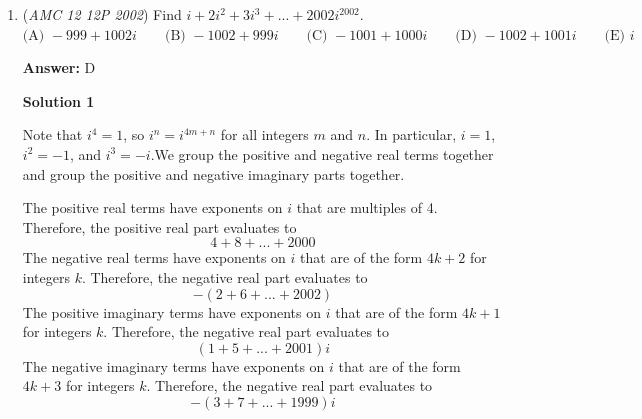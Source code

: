 \begin{enumerate}
 Essentially, this boils down to writing $217$ as a difference of squares. Assume there exist positive integers $a$ and $b$ where $a > 17$ and $b \leq 17$ such that $a^2 - b^2 = 217$.

 We can rewrite this as $(a+b)(a-b) = 217$. Since $217 = 7 \cdot 31$, either $a+b = 217$ and $a-b = 1$ or $a+b = 31$ and $a-b = 7$. We analyze each case separately.

 Case 1: $a+b = 217$ and $a-b = 1$

 Solving this system of equations gives $a = 109$ and $b = 108$. However, $108 > 17$, so this case does not yield a solution.

 Case 2: $a+b = 31$ and $a-b = 7$

 Solving this system of equations gives $a = 19$ and $b = 12$. This satisfies all the requirements of the problem.

 The list $1, 2 ... 11, 13, 14 ... 17, 19$ has $17$ terms whose sum of squares equals $2002$. Since $n \geq 18$ is impossible, the answer is $\boxed {\textbf{(D) }17}$.

 


	\item (\textit{AMC 12 12P 2002}) Find $i + 2i^2 +3i^3 + . . . + 2002i^{2002}.$
$\text{(A) }-999 + 1002i \qquad \text{(B) }-1002 + 999i \qquad \text{(C) }-1001 + 1000i \qquad \text{(D) }-1002 + 1001i \qquad \text{(E) }i$

 \textbf{Answer: }D



\textbf{Solution 1}

Note that $i^4 = 1$, so $i^n = i^{4m+n}$ for all integers $m$ and $n$. In particular, $i = 1$, $i^2 = -1$, and $i^3 = -i$.We group the positive and negative real terms together and group the positive and negative imaginary parts together.

 The positive real terms have exponents on $i$ that are multiples of 4. Therefore, the positive real part evaluates to 
 \[4 + 8 + ... + 2000\]The negative real terms have exponents on $i$ that are of the form $4k + 2$ for integers $k$. Therefore, the negative real part evaluates to 
 \[-(2 + 6 + ... + 2002)\]The positive imaginary terms have exponents on $i$ that are of the form $4k + 1$ for integers $k$. Therefore, the negative real part evaluates to 
 \[(1 + 5 + ... + 2001)i\]The negative imaginary terms have exponents on $i$ that are of the form $4k + 3$ for integers $k$. Therefore, the negative real part evaluates to 
 \[-(3 + 7 + ... + 1999)i\]


\end{enumerate}
